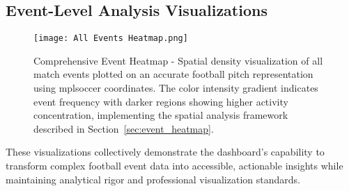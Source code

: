 \documentclass[12pt,a4paper]{article}
\begin{document}
\subsection{Event-Level Analysis Visualizations}

\begin{figure}[H]
    \centering
    \texttt{[image: All Events Heatmap.png]}
    \caption{Comprehensive Event Heatmap - Spatial density visualization of all match events plotted on an accurate football pitch representation using mplsoccer coordinates. The color intensity gradient indicates event frequency with darker regions showing higher activity concentration, implementing the spatial analysis framework described in Section~\ref{sec:event_heatmap}.}
    \label{fig:events_heatmap}
\end{figure}

These visualizations collectively demonstrate the dashboard's capability to transform complex football event data into accessible, actionable insights while maintaining analytical rigor and professional visualization standards.
\end{document}
